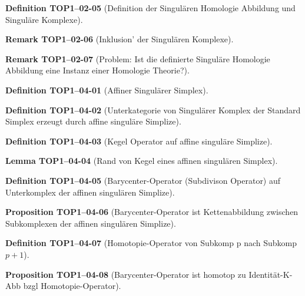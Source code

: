 \documentclass[10pt, letterpaper]{article}
\newcommand{\CustomHeading}[3]{%
  \par\medskip\noindent%
  \textbf{#1 #2} \textnormal{(#3)}.\enskip%
}
\newenvironment{DEF}[2]{\CustomHeading{Definition}{#1}{#2}}{}
\newenvironment{PROP}[2]{\CustomHeading{Proposition}{#1}{#2}}{}
\newenvironment{LEM}[2]{\CustomHeading{Lemma}{#1}{#2}}{}
\newenvironment{REM}[2]{\CustomHeading{Remark}{#1}{#2}}{}
\begin{document}
\begin{DEF}{TOP1--02-05}{Definition der Singulären Homologie Abbildung und Singuläre Komplexe}
\end{DEF}

\begin{REM}{TOP1--02-06}{Inklusion' der Singulären Komplexe}
\end{REM}

\begin{REM}{TOP1--02-07}{Problem: Ist die definierte Singuläre Homologie Abbildung eine Instanz einer Homologie Theorie?}
\end{REM}

\begin{DEF}{TOP1--04-01}{Affiner Singulärer Simplex}
\end{DEF}

\begin{DEF}{TOP1--04-02}{Unterkategorie von Singulärer Komplex der Standard Simplex erzeugt durch affine singuläre Simplize}
\end{DEF}

\begin{DEF}{TOP1--04-03}{Kegel Operator auf affine singuläre Simplize}
\end{DEF}

\begin{LEM}{TOP1--04-04}{Rand von Kegel eines affinen singulären Simplex}
\end{LEM}

\begin{DEF}{TOP1--04-05}{Barycenter-Operator (Subdivison Operator) auf Unterkomplex der affinen singulären Simplize}
\end{DEF}

\begin{PROP}{TOP1--04-06}{Barycenter-Operator ist Kettenabbildung zwischen Subkomplexen der affinen singulären Simplize}
\end{PROP}

\begin{DEF}{TOP1--04-07}{Homotopie-Operator von Subkomp p nach Subkomp $p+1$}
\end{DEF}

\begin{PROP}{TOP1--04-08}{Barycenter-Operator ist homotop zu Identität-K-Abb bzgl Homotopie-Operator}
\end{PROP}
\end{document}
